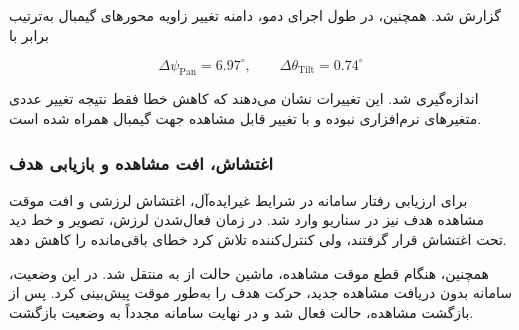\documentclass[12pt,a4paper]{article}
\begin{document}
گزارش شد. همچنین، در طول اجرای دمو، دامنه تغییر زاویه محورهای
گیمبال به‌ترتیب برابر با

\begin{equation}
	\Delta\psi_{\mathrm{Pan}}
	=
	6.97^\circ,
	\qquad
	\Delta\theta_{\mathrm{Tilt}}
	=
	0.74^\circ
	\label{eq:measured_gimbal_motion}
\end{equation}

اندازه‌گیری شد. این تغییرات نشان می‌دهند که کاهش خطا فقط نتیجه
تغییر عددی متغیرهای نرم‌افزاری نبوده و با تغییر قابل مشاهده جهت
گیمبال همراه شده است.

\subsubsection{اغتشاش، افت مشاهده و بازیابی هدف}
\label{subsubsec:demo_disturbance_recovery}

برای ارزیابی رفتار سامانه در شرایط غیرایده‌آل، اغتشاش لرزشی و
افت موقت مشاهده هدف نیز در سناریو وارد شد. در زمان فعال‌شدن
لرزش، تصویر و خط دید تحت اغتشاش قرار گرفتند، ولی کنترل‌کننده تلاش
کرد خطای باقی‌مانده را کاهش دهد.

همچنین، هنگام قطع موقت مشاهده، ماشین حالت از
به
منتقل شد. در این وضعیت، سامانه بدون دریافت مشاهده جدید، حرکت هدف
را به‌طور موقت پیش‌بینی کرد. پس از بازگشت مشاهده، حالت
فعال شد و در نهایت سامانه مجدداً به وضعیت
بازگشت.
\end{document}
